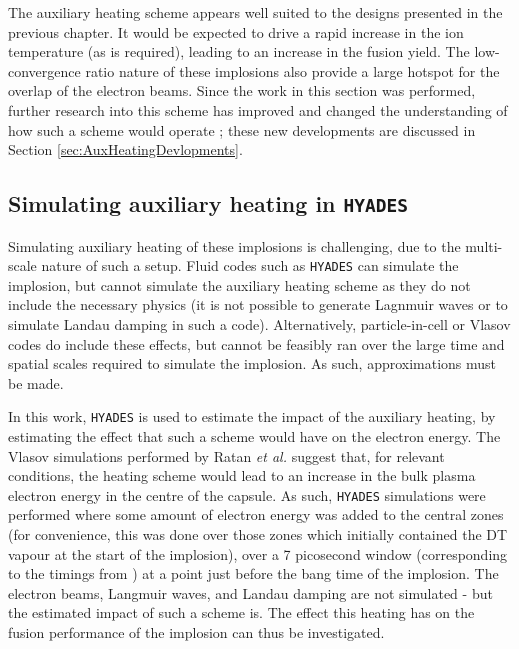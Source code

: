The auxiliary heating scheme appears well suited to the designs presented in the previous chapter. It would be expected to drive a rapid increase in the ion temperature (as is required), leading to an increase in the fusion yield. The low-convergence ratio nature of these implosions also provide a large hotspot for the overlap of the electron beams. Since the work in this section was performed, further research into this scheme has improved and changed the understanding of how such a scheme would operate \cite{Lee2023}; these new developments are discussed in Section \ref{sec:AuxHeatingDevlopments}.

\subsection{Simulating auxiliary heating in \texttt{HYADES}}

Simulating auxiliary heating of these implosions is challenging, due to the multi-scale nature of such a setup. Fluid codes such as \texttt{HYADES} can simulate the implosion, but cannot simulate the auxiliary heating scheme as they do not include the necessary physics (it is not possible to generate Lagnmuir waves or to simulate Landau damping in such a code). Alternatively, particle-in-cell or Vlasov codes do include these effects, but cannot be feasibly ran over the large time and spatial scales required to simulate the implosion. As such, approximations must be made.

In this work, \texttt{HYADES} is used to estimate the impact of the auxiliary heating, by estimating the effect that such a scheme would have on the electron energy. The Vlasov simulations performed by Ratan \textit{et al.} suggest that, for relevant conditions, the heating scheme would lead to an increase in the bulk plasma electron energy in the centre of the capsule. As such, \texttt{HYADES} simulations were performed where some amount of electron energy was added to the central zones (for convenience, this was done over those zones which initially contained the DT vapour at the start of the implosion), over a 7 picosecond window (corresponding to the timings from \cite{Ratan2017}) at a point just before the bang time of the implosion. The electron beams, Langmuir waves, and Landau damping are not simulated - but the estimated impact of such a scheme is. The effect this heating has on the fusion performance of the implosion can thus be investigated.

